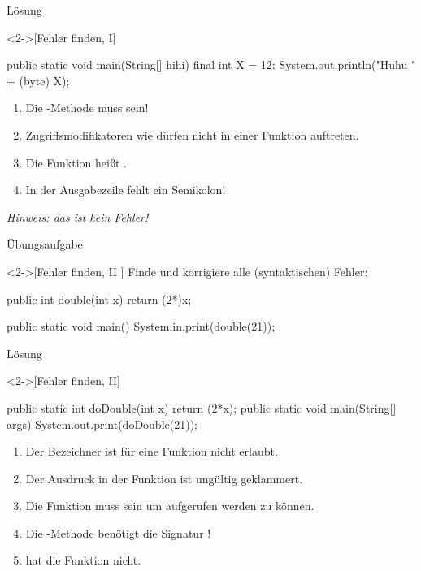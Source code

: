 \begin{frame}[c,fragile]{Lösung}
    \begin{solve}<2->[Fehler finden, I]
        \pause{}\begin{plainjava}
public static void main(String[] hihi) {
    final int X = 12;
    System.out.println("Huhu " + (byte) X);
}
        \end{plainjava}
    \begin{enumerate}[<+(1)->]
        \item Die -Methode muss  sein!
        \item Zugriffsmodifikatoren wie  dürfen nicht in einer Funktion auftreten.
        \item Die Funktion  heißt .
        \item In der Ausgabezeile fehlt ein Semikolon!
    \end{enumerate}
    \pause{}\textit{Hinweis: das  ist kein Fehler!}
    \end{solve}
\end{frame}

\begin{frame}[c,fragile]{Übungsaufgabe}
    \begin{exercise}<2->[Fehler finden, II ]
        \pause{}Finde und korrigiere alle (syntaktischen) Fehler:\pause{}
        \begin{plainvoid}
public int double(int x) { return (2*)x; }

public static void main() {
    System.in.print(double(21));
}
        \end{plainvoid}
    \end{exercise}
\end{frame}

\begin{frame}[c,fragile]{Lösung}
    \begin{solve}<2->[Fehler finden, II]
        \pause{}\begin{plainjava}
public static int doDouble(int x) { return (2*x); }
public static void main(String[] args) {
    System.out.print(doDouble(21));
}
        \end{plainjava}
    \begin{enumerate}[<+(1)->]
        \item Der Bezeichner  ist für eine Funktion nicht erlaubt.
        \item Der Ausdruck in der Funktion ist ungültig geklammert.
        \item Die Funktion muss  sein um aufgerufen werden zu können.
        \item Die -Methode benötigt die Signatur !
        \item {} hat die Funktion  nicht.
    \end{enumerate}
    \end{solve}
\end{frame}

